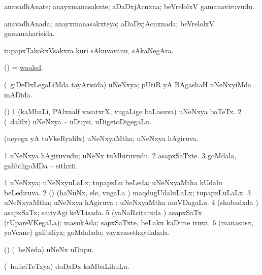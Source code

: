 \bentry
{} 
\gl{\nA}
\expl{}
\bmng
anavadhAnate; anayxmanasakxte; aDaDxjAcnxna; beVrelolxV gamanaviruvudu. 
\emng
\eentry

\bentry
{} 
\gl{\gu}
\expl{}
\bmng
anavadhAnada; anayxmanasakxteya; aDaDxjAcnxnada; beVrelolxV gamanaharisida. 
\emng
\eentry

\bentry
{} 
\gl{\nA}
\expl{}
\bmng
tupapxTakokxVsakxra kuri sAkuvavanu, sAkaNegAra. 
\emng
\eentry

\bentry
{} 
\gl{\gu}
\expl{}
\bmng
(\ame) = \hyperlink{wooled}{wooled}. 
\emng
\eentry

\bentry
{} 
\gl{\gu}
\expl{}
\bmng
(\kanmu\ giDeDxLegaLiMda tayArisida) uNeNxya; pUtiR yA BAgashaH uNeNxyiMda mADida. 
\emng
\eentry

\bentry
{} 
\gl{\nA}
\expl{}
\bmng
(\ame) 
\bnum
\num{1} (kaMbaLi, PAlxnalf vasatxrX, \mo vugaLige baLasuva) uNeNxya baTeTx. 
\num{2} (\kanmu\ \bava dalilx) uNeNxya -- uDupu, uDigetoDigegaLu. 
\enum
\emng
\eentry

\bentry
{} 
\gl{\gu}
\expl{}
\bmng
(neyegx yA toVkeRyalilx) uNeNxyaMtha; uNeNxya hAgiruva. 
\emng
\eentry

\bentry
{} 
\gl{\nA}
\expl{}
\bmng
\bnum
\num{1} uNeNxya hAgiruvudu; uNeNx tuMbiruvudu. 
\num{2} asapxSaTxte. 
\num{3} goMdala, galibiligoMDa -- sithxti. 
\enum
\emng
\eentry

\bentry
{} 
\gl{\gu}
\bmng
\bnum
\num{1} uNeNxya; uNeNxyuLaLx; tupapxLu beLeda; uNeNxyaMtha kUdalu beLediruva. 
\num{2} (\savi) (haNuNx, ele, \mo vugaLa \vi) maqdugUdaluLaLx; tupapxLuLaLx. 
\num{3} uNeNxyaMtha; uNeNxya hAgiruva :  uNeNxyaMtha moVDagaLu. 
\num{4} (shabadxda \vi) asapxSaTx; sariyAgi keVLisada. 
\num{5} (vaNaRcitarxda \vi) asapxSaTx (rUpareVKegaLa); masukAda; sapxSaTxte, beLaku kaDime iruva. 
\num{6} (manasusx, yoVcane) galibiliya; goMdalada; vayxvasethxyilalxda. 
\enum
\emng
\eentry

\bentry
{} 
\gl{\nA}
\bmng
(\AmA) (\kanmu\ heNeda) uNeNx uDupu. 
\emng
\eentry

\bentry
{} 
\gl{\nA}
\expl{}
\bmng
(\kanmu\ huliciTeTxya) doDaDx kaMbaLihuLu. 
\emng
\eentry

